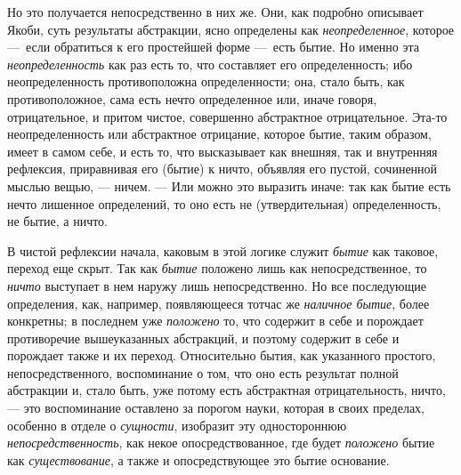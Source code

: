 Но это получается непосредственно в них же. Они, как подробно описывает
Якоби, суть результаты абстракции, ясно определены как
{\em неопределенное}, которое ---~если обратиться к его
простейшей форме ---~есть бытие. Но именно эта
{\em неопределенность} как раз есть то, что составляет
его определенность; ибо неопределенность противоположна определенности;
она, стало быть, как противоположное, сама есть нечто определенное или,
иначе говоря, отрицательное, и притом чистое, совершенно абстрактное
отрицательное. Эта-то неопределенность или абстрактное отрицание, которое
бытие, таким образом, имеет в самом себе, и есть то, что высказывает как
внешняя, так и внутренняя рефлексия, приравнивая его (бытие) к ничто,
объявляя его пустой, сочиненной мыслью вещью, --- ничем. --- Или можно это
выразить иначе: так как бытие есть нечто лишенное определений, то оно есть
не (утвердительная) определенность, не бытие, а ничто.

В чистой рефлексии начала, каковым в этой логике служит
{\em бытие} как таковое, переход еще скрыт. Так как
{\em бытие} положено лишь как непосредственное, то
{\em ничто} выступает в нем наружу лишь
непосредственно. Но все последующие определения, как, например,
появляющееся тотчас же {\em наличное бытие}, более
конкретны; в последнем уже {\em положено} то, что
содержит в себе и порождает противоречие вышеуказанных абстракций, и
поэтому содержит в себе и порождает также и их переход. Относительно бытия,
как указанного простого, непосредственного, воспоминание о том, что оно
есть результат полной абстракции и, стало быть, уже потому есть абстрактная
отрицательность, ничто, --- это воспоминание оставлено за порогом науки,
которая в своих пределах, особенно в отделе о
{\em сущности}, изобразит эту одностороннюю
{\em непосредственность}, как некое опосредствованное,
где будет {\em положено} бытие как
{\em существование}, а также и опосредствующее это
бытие основание.

